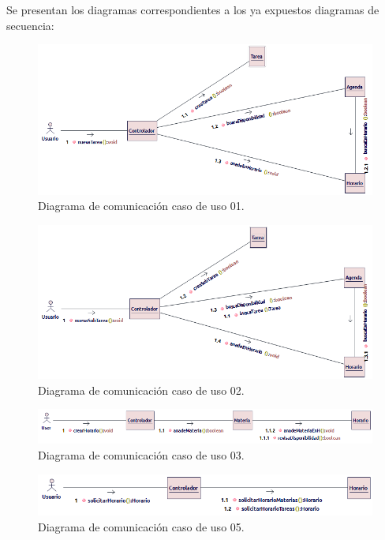 Se presentan los diagramas correspondientes a los ya expuestos diagramas de secuencia:

\begin{figure}[H]
	\centering
	\includegraphics[width=0.7\linewidth]{diseno/requerimientos/imagenes/comunicacionE01.png} 
	\caption{Diagrama de comunicación caso de uso 01.}
	\label{fig:gantt}
\end{figure}

\begin{figure}[H]
	\centering
	\includegraphics[width=0.7\linewidth]{diseno/requerimientos/imagenes/comunicacionE02.png} 
	\caption{Diagrama de comunicación caso de uso 02.}
	\label{fig:gantt}
\end{figure}

\begin{figure}[H]
	\centering
	\includegraphics[width=0.7\linewidth]{diseno/requerimientos/imagenes/comunicacionE03.png} 
	\caption{Diagrama de comunicación caso de uso 03.}
	\label{fig:gantt}
\end{figure}

\begin{figure}[H]
	\centering
	\includegraphics[width=0.7\linewidth]{diseno/requerimientos/imagenes/comunicacionE05.png} 
	\caption{Diagrama de comunicación caso de uso 05.}
	\label{fig:gantt}
\end{figure}


